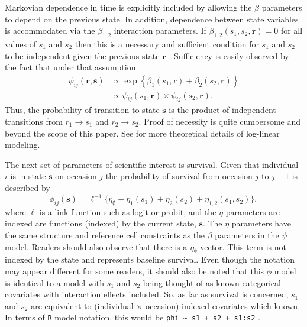 \documentclass[sts]{imsart}
\numberwithin{equation}{section}
\theoremstyle{plain}
\newcommand{\bs}{\ensuremath{\mathbf{s}}}
\newcommand{\br}{\ensuremath{\mathbf{r}}}
\begin{document}
Markovian dependence in time is explicitly included by allowing the $\beta$
parameters to depend on the previous state. In addition, dependence between
state variables is accommodated via the $\beta_{1,2}$ interaction parameters. If
$\beta_{1,2}(s_1,s_2,\br)=0$ for all values of $s_1$ and $s_2$ then this is a
necessary and sufficient condition for $s_1$ and $s_2$ to be independent given
the previous state $\br$ \citep{xxx}. Sufficiency is easily observed by the fact
that under that assumption
\begin{equation}
\begin{split}
\psi_{ij}(\br,\bs) &\propto \exp\left\{\beta_1(s_1,\br) + \beta_2(s_2,\br)\right\}\\
 & \propto \psi_{ij}{(s_1,\br)}\times \psi_{ij}{(s_2,\br)}.
 \end{split}
 \end{equation}
Thus, the probability of transition to state $\bs$ is the product of independent transitions from $r_1 \to s_1$ and $r_2 \to s_2$. Proof of necessity is quite cumbersome and beyond the scope of this paper. See \citet{xxx} for more theoretical details of log-linear modeling. 

The next set of parameters of scientific interest is survival. Given that individual $i$ is in state $\bs$ on occasion $j$ the probability of survival from occasion $j$ to $j+1$ is described by
\begin{equation}
\phi_{ij}(\bs) = \ell^{-1}\{\eta_\emptyset + \eta_1(s_1) + \eta_2(s_2) + \eta_{1,2}(s_1,s_2)\},
\end{equation}
where $\ell$ is a link function such as logit or probit, and the $\eta$ parameters are indexed are functions (indexed) by the current state, $\bs$. The $\eta$ parameters have the same structure and reference cell constraints as the $\beta$ parameters  in the $\psi$ model. Readers should also observe that there is a $\eta_\emptyset$ vector. This term is not indexed by the state and represents baseline survival. Even though the notation may appear different for some readers, it should also be noted that this $\phi$ model is identical to a model with $s_1$ and $s_2$ being thought of as known categorical covariates with interaction effects included. So, as far as survival is concerned, $s_1$ and $s_2$ are equivalent to (individual $\times$ occasion) indexed covariates which known. In terms of {\tt R} model notation, this would be \verb#phi ~ s1 + s2 + s1:s2# .
\end{document}
